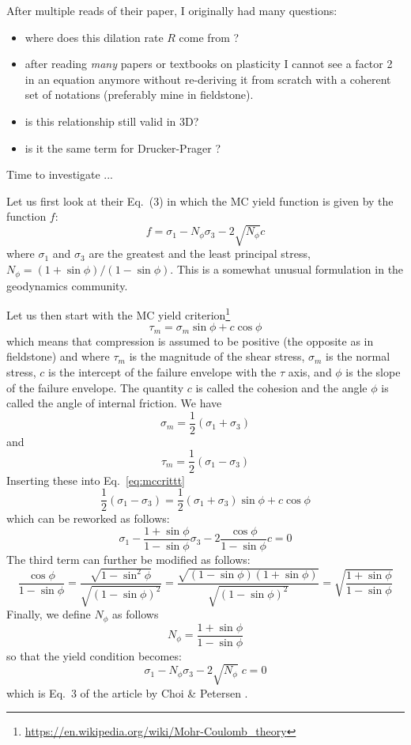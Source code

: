 After multiple reads of their paper, I originally had many questions:
\begin{itemize}
\item where does this dilation rate $R$ come from ? 
\item after reading \textit{many} papers or textbooks on plasticity 
I cannot see a factor 2 in an equation anymore without re-deriving 
it from scratch with a coherent set of notations (preferably mine in fieldstone). 
\item is this relationship still valid in 3D?
\item is it the same term for Drucker-Prager ?
\end{itemize}
Time to investigate ...
\vspace{1cm}

Let us first look at their Eq.~(3)  in which  
the MC yield function is given by the function $f$:
\[
f = \sigma_1 - N_\phi \sigma_3 - 2 \sqrt{N_\phi} c 
\]
where $\sigma_1$ and $\sigma_3$ are the greatest and the least principal stress, $N_\phi=(1+\sin \phi)/(1-\sin \phi)$.
This is a somewhat unusual formulation in the geodynamics community.

Let us then start with the MC yield criterion\footnote{\url{https://en.wikipedia.org/wiki/Mohr-Coulomb_theory}}
\begin{equation}
\tau_m = \sigma_m \sin \phi + c \cos \phi  \label{eq:mccrittt}
\end{equation}
which means that compression is assumed to be positive (the opposite as in fieldstone) and where $\tau_m$ is the magnitude of the shear stress, 
$\sigma_m$ is the normal stress, $c$ is the intercept of the failure envelope with the $\tau$ axis, 
and $\phi$ is the slope of the failure envelope. 
The quantity $c$ is called the cohesion and the angle $\phi$ is called the angle of internal friction.
We have
\[
\sigma_m=\frac{1}{2}(\sigma_1+\sigma_3) 
\]
and 
\[
\tau_m = \frac{1}{2}(\sigma_1-\sigma_3)
\]
Inserting these into Eq.~\eqref{eq:mccrittt}
\begin{equation}
 \frac{1}{2}(\sigma_1-\sigma_3) = \frac{1}{2}(\sigma_1+\sigma_3)  \sin \phi + c \cos \phi 
\end{equation}
which can be reworked as follows:
\[
\sigma_1 - \frac{1 + \sin\phi}{1-\sin\phi} \sigma_3 - 2 \frac{\cos \phi}{1-\sin\phi} c = 0
\]
The third term can further be modified as follows:
\[
\frac{\cos \phi}{1-\sin\phi}
=\frac{\sqrt{1-\sin^2 \phi}}{\sqrt{(1-\sin\phi)^2}}
=\frac{\sqrt{(1-\sin \phi)(1+\sin\phi)}}{\sqrt{(1-\sin\phi)^2}}
=\sqrt{
\frac{1+\sin\phi}{1-\sin\phi}
}
\]
Finally, we define $N_\phi$ as follows 
\[
N_\phi=\frac{1+\sin \phi}{1-\sin\phi}
\]
so that the yield condition becomes:
\[
\sigma_1 - N_\phi \sigma_3 - 2 \sqrt{N_\phi} \; c = 0
\]
which is Eq.~3 of the article by Choi \& Petersen \cite{chpe15}.

